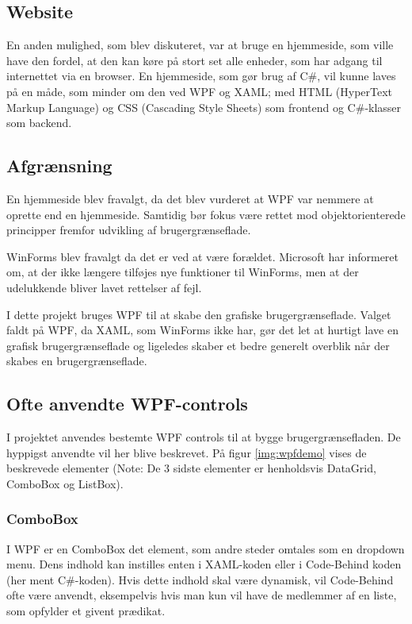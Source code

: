 \subsection{Website}
En anden mulighed, som blev diskuteret, var at bruge en hjemmeside, som ville have den fordel, at den kan køre på stort set alle enheder, som har adgang til internettet via en browser. 
En hjemmeside, som gør brug af C\#, vil kunne laves på en måde, som minder om den ved WPF og XAML; med HTML (HyperText Markup Language) og CSS (Cascading Style Sheets) som frontend og C\#-klasser som backend. 

\subsection{Afgrænsning}
En hjemmeside blev fravalgt, da det blev vurderet at WPF var nemmere at oprette end en hjemmeside. Samtidig bør fokus være rettet mod objektorienterede principper fremfor udvikling af brugergrænseflade.

WinForms blev fravalgt da det er ved at være forældet.
Microsoft har informeret om, at der ikke længere tilføjes nye funktioner til WinForms, men at der udelukkende bliver lavet rettelser af fejl.\citep{winforms}

I dette projekt bruges WPF til at skabe den grafiske brugergrænseflade. 
Valget faldt på WPF, da XAML, som WinForms ikke har, gør det let at hurtigt lave en grafisk brugergrænseflade og ligeledes skaber et bedre generelt overblik når der skabes en brugergrænseflade.


\subsection{Ofte anvendte WPF-controls}
I projektet anvendes bestemte WPF controls til at bygge brugergrænsefladen. 
De hyppigst anvendte vil her blive beskrevet. 
På figur \ref{img:wpfdemo} vises de beskrevede elementer (Note: De 3 sidste elementer er henholdsvis DataGrid, ComboBox og ListBox).

\subsubsection*{ComboBox}
I WPF er en ComboBox det element, som andre steder omtales som en dropdown menu. 
Dens indhold kan instilles enten i XAML-koden eller i Code-Behind koden (her ment C\#-koden).
Hvis dette indhold skal være dynamisk, vil Code-Behind ofte være anvendt, eksempelvis hvis man kun vil have de medlemmer af en liste, som opfylder et givent prædikat. 

